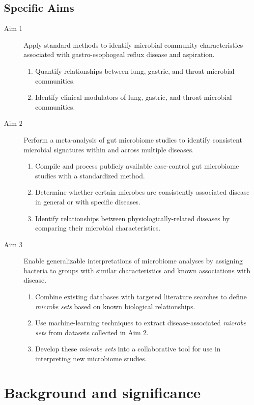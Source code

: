 \documentclass[12pt]{article}
\begin{document}
\subsection{Specific Aims}
\begin{description}
	\item[Aim 1] Apply standard methods to identify microbial 
	community characteristics associated with gastro-esophogeal reflux 
	disease and aspiration.
	\begin{enumerate}
		\item Quantify relationships between lung, gastric, and throat microbial 
		communities.
		\item Identify clinical modulators of lung, gastric, and 
		throat microbial communities.
	\end{enumerate}
	\item[Aim 2] Perform a meta-analysis of gut 
	microbiome studies to identify consistent microbial signatures 
	within and across multiple diseases.
	\begin{enumerate}
		\item Compile and process publicly available case-control gut 
		microbiome studies with a standardized method.
		\item Determine whether certain microbes are consistently 
		associated disease in general or with specific diseases.
		\item Identify relationships between physiologically-related 
		diseases by comparing their microbial characteristics.
	\end{enumerate}
	\item[Aim 3] Enable generalizable interpretations of microbiome 
	analyses by assigning bacteria to groups with similar characteristics 
	and known associations with disease.
	\begin{enumerate}
		\item Combine existing databases with targeted literature searches 
		to define \textit{microbe sets} based on known biological 
		relationships.
		\item Use machine-learning techniques to extract disease-associated 
		\textit{microbe sets} from datasets collected in Aim 2.
		\item Develop these \textit{microbe sets} into a collaborative 
		tool for use in interpreting new microbiome studies.
	\end{enumerate}
\end{description}
\newpage

\section{Background and significance}
\end{document}
